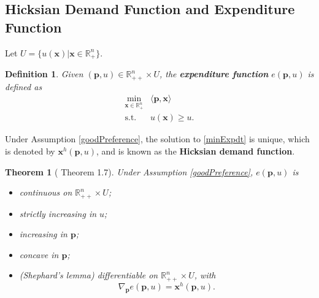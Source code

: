 \documentclass[openany]{book}
\newtheorem{definition}{Definition}[chapter]
\newtheorem{theorem}{Theorem}[chapter]
\theoremstyle{remark}
\begin{document}
\subsection{Hicksian Demand Function and Expenditure Function}
Let $U=\{u(\boldsymbol{x})|\boldsymbol{x}\in \mathbb{R}_+^n\}$.
\begin{definition}
    Given $(\boldsymbol{p},u)\in \mathbb{R}_{++}^n\times U$, the \textbf{expenditure function} $e(\boldsymbol{p},u)$ is defined as
    \begin{equation}\label{minExpdt}
        \begin{array}{rl}
            \displaystyle\min_{\boldsymbol{x}\in \mathbb{R}_+^n} & \langle \boldsymbol{p},\boldsymbol{x}\rangle \\
            \mathrm{s.t.} & u(\boldsymbol{x})\ge u.
        \end{array}
    \end{equation}
\end{definition}
Under Assumption \ref{goodPreference}, the solution to \eqref{minExpdt} is unique, which is denoted by $\boldsymbol{x}^h(\boldsymbol{p},u)$, and is known as the \textbf{Hicksian demand function}.
\begin{theorem}[\cite{J01} Theorem 1.7]
    Under Assumption \ref{goodPreference}, $e(\boldsymbol{p},u)$ is
    \begin{itemize}
        \item continuous on $\mathbb{R}_{++}^n\times U$;
        \item strictly increasing in $u$;
        \item increasing in $\boldsymbol{p}$;
        \item concave in $\boldsymbol{p}$;
        \item (Shephard's lemma) differentiable on $\mathbb{R}_{++}^n\times U$, with
        \begin{equation}
            \nabla_{\boldsymbol{p}}e(\boldsymbol{p},u)=\boldsymbol{x}^h(\boldsymbol{p},u).
        \end{equation}
    \end{itemize}
\end{theorem}
\end{document}
